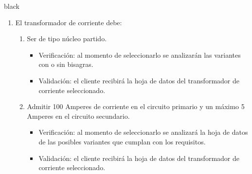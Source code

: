 \documentclass[11pt]{charter}
\begin{document}
\begin{consigna}{black}
\begin{enumerate}
\begin{enumerate}[label*=\arabic*.]
			\item El transformador de corriente debe:
			\begin{enumerate}[label*=\arabic*.]
				\item Ser de tipo núcleo partido.
					\begin{itemize}
						\item Verificación: al momento de seleccionarlo se analizarán las variantes con o sin bisagras.\\
						\item Validación: el cliente recibirá la hoja de datos del transformador de corriente seleccionado.\\
					\end{itemize}
				\item Admitir 100 Amperes de corriente en el circuito primario y un máximo 5 Amperes en el circuito secundario.
					\begin{itemize}
						\item Verificación: al momento de seleccionarlo se analizará la hoja de datos de las posibles variantes que cumplan con los requisitos.\\
						\item Validación: el cliente recibirá la hoja de datos del transformador de corriente seleccionado.\\
					\end{itemize}
			\end{enumerate}
			

\end{enumerate}
\end{enumerate}
\end{consigna}
\end{document}
